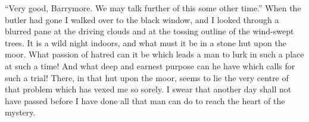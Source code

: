 \enquote{Very good, Barrymore. We may talk further of this some other time.} When the butler had gone I walked over to the black window, and I looked through a blurred pane at the driving clouds and at the tossing outline of the wind-swept trees. It is a wild night indoors, and what must it be in a stone hut upon the moor. What passion of hatred can it be which leads a man to lurk in such a place at such a time! And what deep and earnest purpose can he have which calls for such a trial! There, in that hut upon the moor, seems to lie the very centre of that problem which has vexed me so sorely. I swear that another day shall not have passed before I have done all that man can do to reach the heart of the mystery.

